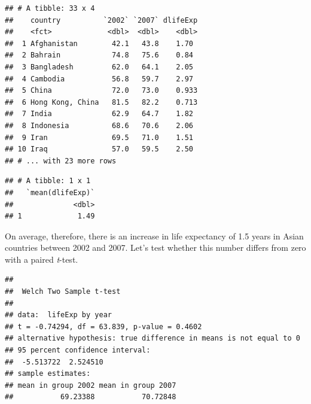 \documentclass[12pt,]{krantz}
\makeatletter
\newenvironment{Shaded}{\begin{snugshade}}{\end{snugshade}}
\newcommand{\CommentTok}[1]{\textcolor[rgb]{0.56,0.35,0.01}{\textit{#1}}}
\newcommand{\DataTypeTok}[1]{\textcolor[rgb]{0.13,0.29,0.53}{#1}}
\newcommand{\KeywordTok}[1]{\textcolor[rgb]{0.13,0.29,0.53}{\textbf{#1}}}
\newcommand{\NormalTok}[1]{#1}
\newcommand{\OperatorTok}[1]{\textcolor[rgb]{0.81,0.36,0.00}{\textbf{#1}}}
\newcommand{\StringTok}[1]{\textcolor[rgb]{0.31,0.60,0.02}{#1}}
\newenvironment{kframe}{%
\medskip{}
\setlength{\fboxsep}{.8em}
 \def\at@end@of@kframe{}%
 \ifinner\ifhmode%
  \def\at@end@of@kframe{\end{minipage}}%
  \begin{minipage}{\columnwidth}%
 \fi\fi%
 \def\FrameCommand##1{\hskip\@totalleftmargin \hskip-\fboxsep
 \colorbox{shadecolor}{##1}\hskip-\fboxsep
     \hskip-\linewidth \hskip-\@totalleftmargin \hskip\columnwidth}%
 \MakeFramed {\advance\hsize-\width
   \@totalleftmargin\z@ \linewidth\hsize
   \@setminipage}}%
 {\par\unskip\endMakeFramed%
 \at@end@of@kframe}
\renewenvironment{Shaded}{\begin{kframe}}{\end{kframe}}
\theoremstyle{definition}
\theoremstyle{definition}
\theoremstyle{definition}
\theoremstyle{remark}
\makeatother
\begin{document}
\begin{verbatim}
## # A tibble: 33 x 4
##    country          `2002` `2007` dlifeExp
##    <fct>             <dbl>  <dbl>    <dbl>
##  1 Afghanistan        42.1   43.8    1.70 
##  2 Bahrain            74.8   75.6    0.84 
##  3 Bangladesh         62.0   64.1    2.05 
##  4 Cambodia           56.8   59.7    2.97 
##  5 China              72.0   73.0    0.933
##  6 Hong Kong, China   81.5   82.2    0.713
##  7 India              62.9   64.7    1.82 
##  8 Indonesia          68.6   70.6    2.06 
##  9 Iran               69.5   71.0    1.51 
## 10 Iraq               57.0   59.5    2.50 
## # ... with 23 more rows
\end{verbatim}

\begin{Shaded}
\end{Shaded}

\begin{verbatim}
## # A tibble: 1 x 1
##   `mean(dlifeExp)`
##              <dbl>
## 1             1.49
\end{verbatim}

 
 

On average, therefore, there is an increase in life expectancy of 1.5
years in Asian countries between 2002 and 2007. Let's test whether this
number differs from zero with a paired \emph{t}-test.

\begin{Shaded}
\end{Shaded}

\begin{verbatim}
## 
##  Welch Two Sample t-test
## 
## data:  lifeExp by year
## t = -0.74294, df = 63.839, p-value = 0.4602
## alternative hypothesis: true difference in means is not equal to 0
## 95 percent confidence interval:
##  -5.513722  2.524510
## sample estimates:
## mean in group 2002 mean in group 2007 
##           69.23388           70.72848
\end{verbatim}
\end{document}
